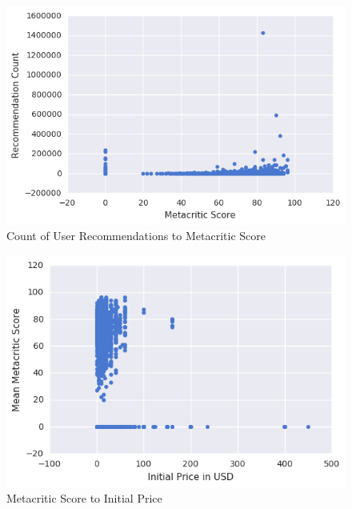 \documentclass[10pt,journal,compsoc]{IEEEtran}
\begin{document}
\begin{figure}[p]
    \caption{Count of User Recommendations to Metacritic Score \label{fig:metacritic-recommendations-all}}
    \includegraphics[width=\textwidth,keepaspectratio]{metacritic-recommendations-scatter-all}
\end{figure}

\begin{figure}[p]
    \caption{Metacritic Score to Initial Price \label{fig:metacritic-price-all}}
    \includegraphics[width=\textwidth,keepaspectratio]{price-metacritic-scatter-all}
\end{figure}
\end{document}
